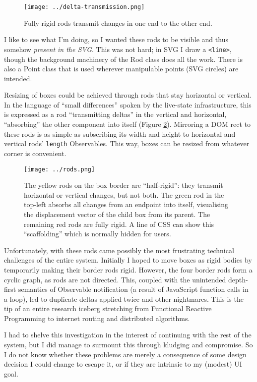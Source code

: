 \begin{figure}[h]
  \centering
  \texttt{[image: ../delta-transmission.png]}
  \caption{Fully rigid rods transmit changes in one end to the other end. \label{fig:delta-transmission}}
\end{figure}

I like to see what I'm doing, so I wanted these rods to be visible and
thus somehow \emph{present in the SVG}. This was not hard; in SVG I draw
a \texttt{\textless{}line\textgreater{}}, though the background
machinery of the Rod class does all the work. There is also a Point
class that is used wherever manipulable points (SVG circles) are
intended.

Resizing of boxes could be achieved through rods that stay horizontal or
vertical. In the language of ``small differences'' spoken by the
live-state infrastructure, this is expressed as a rod ``transmitting
deltas'' in the vertical and horizontal, ``absorbing'' the other
component into itself (Figure \ref{fig:rods}). Mirroring a DOM rect to
these rods is as simple as subscribing its width and height to
horizontal and vertical rods' \texttt{length} Observables. This way,
boxes can be resized from whatever corner is convenient.

\begin{figure}[h]
  \centering
  \texttt{[image: ../rods.png]}
  \caption{The yellow rods on the box border are ``half-rigid'': they transmit horizontal or vertical changes, but not both. The green rod in the top-left absorbs all changes from an endpoint into itself, visualising the displacement vector of the child box from its parent. The remaining red rods are fully rigid. A line of CSS can show this ``scaffolding'' which is normally hidden for users. \label{fig:rods}}
\end{figure}

Unfortunately, with these rods came possibly the most frustrating
technical challenges of the entire system. Initially I hoped to move
boxes as rigid bodies by temporarily making their border rods rigid.
However, the four border rods form a cyclic graph, as rods are not
directed. This, coupled with the unintended depth-first semantics of
Observable notification (a result of JavaScript function calls in a
loop), led to duplicate deltas applied twice and other nightmares. This
is the tip of an entire research iceberg stretching from Functional
Reactive Programming to internet routing and distributed algorithms.

I had to shelve this investigation in the interest of continuing with
the rest of the system, but I did manage to surmount this through
kludging and compromise. So I do not know whether these problems are
merely a consequence of some design decision I could change to escape
it, or if they are intrinsic to my (modest) UI goal.

